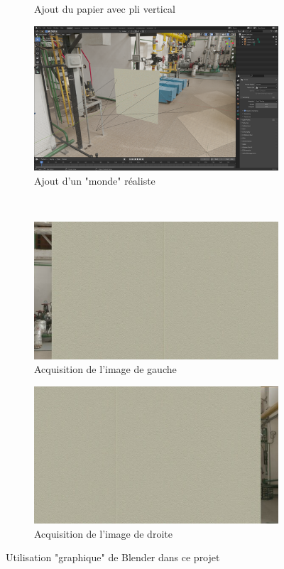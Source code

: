 \documentclass[a4paper, 11pt]{article}
\begin{document}
\begin{figure}
\begin{subfigure}[c]{.48\textwidth}
				\caption{Ajout du papier avec pli vertical}
			\end{subfigure}\hfill
			\begin{subfigure}[c]{.48\textwidth}
				\includegraphics[width=\textwidth]{screen_4_resized.png}
				\caption{Ajout d'un "monde" réaliste}
			\end{subfigure}\\
			\begin{subfigure}[c]{.48\textwidth}
				\includegraphics[width=\textwidth]{view_0_resized.jpg}
				\caption{Acquisition de l'image de gauche}
			\end{subfigure}\hfill
			\begin{subfigure}[c]{.48\textwidth}
				\includegraphics[width=\textwidth]{view_1_resized.jpg}
				\caption{Acquisition de l'image de droite}
			\end{subfigure}
			\caption{\label{fig:blender}Utilisation "graphique" de Blender dans ce projet}
		\end{figure}
\end{document}
